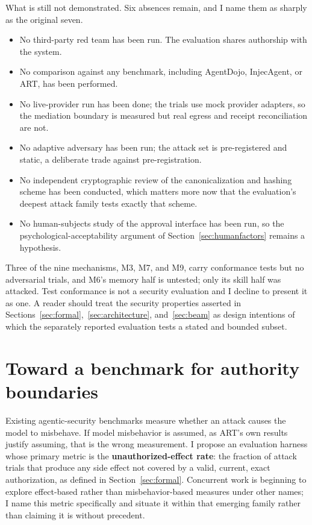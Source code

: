 \documentclass[11pt,letterpaper]{article}
\begin{document}
What is still not demonstrated. Six absences remain, and I name them as sharply as the original seven.

\begin{itemize}[leftmargin=1.4em,itemsep=0.1em,topsep=0.3em]
  \item No third-party red team has been run. The evaluation shares authorship with the system.
  \item No comparison against any benchmark, including AgentDojo, InjecAgent, or ART, has been performed.
  \item No live-provider run has been done; the trials use mock provider adapters, so the mediation boundary is measured but real egress and receipt reconciliation are not.
  \item No adaptive adversary has been run; the attack set is pre-registered and static, a deliberate trade against pre-registration.
  \item No independent cryptographic review of the canonicalization and hashing scheme has been conducted, which matters more now that the evaluation's deepest attack family tests exactly that scheme.
  \item No human-subjects study of the approval interface has been run, so the psychological-acceptability argument of Section~\ref{sec:humanfactors} remains a hypothesis.
\end{itemize}

Three of the nine mechanisms, M3, M7, and M9, carry conformance tests but no adversarial trials, and M6's memory half is untested; only its skill half was attacked. Test conformance is not a security evaluation and I decline to present it as one. A reader should treat the security properties asserted in Sections~\ref{sec:formal},~\ref{sec:architecture}, and~\ref{sec:beam} as design intentions of which the separately reported evaluation tests a stated and bounded subset.

\section{Toward a benchmark for authority boundaries}\label{sec:benchmark}

Existing agentic-security benchmarks measure whether an attack causes the model to misbehave. If model misbehavior is assumed, as ART's own results justify assuming, that is the wrong measurement. I propose an evaluation harness whose primary metric is the \textbf{unauthorized-effect rate}: the fraction of attack trials that produce any side effect not covered by a valid, current, exact authorization, as defined in Section~\ref{sec:formal}. Concurrent work is beginning to explore effect-based rather than misbehavior-based measures under other names; I name this metric specifically and situate it within that emerging family rather than claiming it is without precedent.
\end{document}

